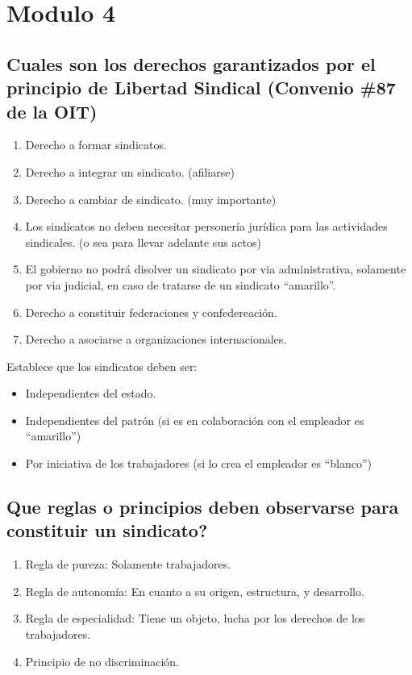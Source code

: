 \documentclass[spanish,12pt,a4paper,titlepage]{report}
\begin{document}
\section{Modulo 4}

\subsection{Cuales son los derechos garantizados por el principio de Libertad Sindical (Convenio \#87 de la OIT)}

\begin{enumerate}
\item Derecho a formar sindicatos.
\item Derecho a integrar un sindicato. (afiliarse)
\item Derecho a cambiar de sindicato. (muy importante)
\item Los sindicatos no deben necesitar personería jurídica para las actividades sindicales. (o sea para llevar adelante sus actos)
\item El gobierno no podrá disolver un sindicato por via administrativa, solamente por via judicial, en caso de tratarse de un sindicato ``amarillo''.
\item Derecho a constituir federaciones y confedereación.
\item Derecho a asociarse a organizaciones internacionales.
\end{enumerate}

Establece que los sindicatos deben ser:
\begin{itemize}
\item Independientes del estado.
\item Independientes del patrón (si es en colaboración con el empleador es ``amarillo'')
\item Por iniciativa de los trabajadores (si lo crea el empleador es ``blanco'')
\end{itemize}

\subsection{Que reglas o principios deben observarse para constituir un sindicato?}

\begin{enumerate}
\item Regla de pureza: Solamente trabajadores.
\item Regla de autonomía: En cuanto a su origen, estructura, y desarrollo.
\item Regla de especialidad: Tiene un objeto, lucha por los derechos de los trabajadores.
\item Principio de no discriminación.
\end{enumerate}
\end{document}
